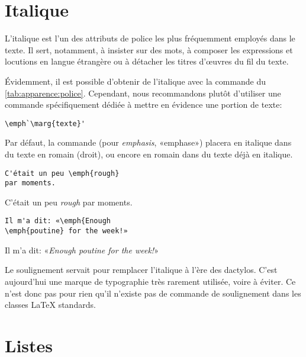 \section{Italique}

L'italique est l'un des attributs de police les plus fréquemment
employés dans le texte. Il sert, notamment, à insister sur des mots, à
composer les expressions et locutions en langue étrangère ou à
détacher les titres d'{\oe}uvres du fil du texte.

Évidemment, il est possible d'obtenir de l'italique avec la commande
\cmd{\textit} du \autoref{tab:apparence:police}. Cependant, nous
recommandons plutôt d'utiliser une commande spécifiquement dédiée à
mettre en évidence une portion de texte:
\begin{lstlisting}
\emph`\marg{texte}'
\end{lstlisting}
Par défaut, la commande \cmd{\emph} (pour \emph{emphasis}, «emphase»)
placera  en italique dans du texte en romain (droit), ou
encore en romain dans du texte déjà en italique.
\begin{demo}
  \begin{texample}
\begin{lstlisting}
C'était un peu \emph{rough}
par moments.
\end{lstlisting}
    \producing
    C'était un peu \emph{rough} par moments.
  \end{texample}
  \begin{texample}
\begin{lstlisting}
Il m'a dit: «\emph{Enough
\emph{poutine} for the week!»
\end{lstlisting}
    \producing
    Il m'a dit: «\emph{Enough \emph{poutine} for the week!}»
  \end{texample}
\end{demo}

\begin{conseil}
  Le soulignement servait pour remplacer
  l'italique à l'ère des dactylos. C'est aujourd'hui une marque de
  typographie très rarement utilisée, voire à éviter. Ce n'est donc
  pas pour rien qu'il n'existe pas de commande de soulignement dans
  les classes {\LaTeX} standards.
\end{conseil}


\section{Listes}
\label{sec:apparence:listes}


